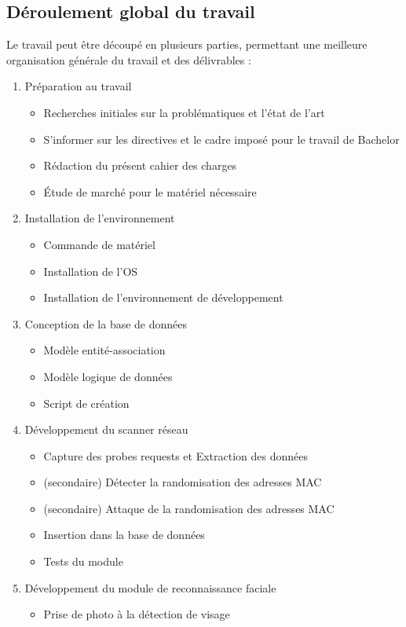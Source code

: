 \subsection*{Déroulement global du travail}
Le travail peut être découpé en plusieurs parties, permettant une meilleure organisation générale du travail et des
délivrables :
\begin{enumerate}
\item Préparation au travail
\begin{itemize}
	\item Recherches initiales sur la problématiques et l’état de l’art
	\item S’informer sur les directives et le cadre imposé pour le travail de Bachelor
	\item Rédaction du présent cahier des charges
	\item Étude de marché pour le matériel nécessaire
\end{itemize}
\item Installation de l’environnement
\begin{itemize}
	\item Commande de matériel
	\item Installation de l’OS
	\item Installation de l’environnement de développement
\end{itemize}
\item Conception de la base de données
\begin{itemize}
	\item Modèle entité-association
	\item Modèle logique de données
	\item Script de création
\end{itemize}
\item Développement du scanner réseau
\begin{itemize}
	\item Capture des probes requests et Extraction des données
	\item (secondaire) Détecter la randomisation des adresses MAC
	\item (secondaire) Attaque de la randomisation des adresses MAC
	\item Insertion dans la base de données
	\item Tests du module
\end{itemize}
\item Développement du module de reconnaissance faciale
\begin{itemize}
	\item Prise de photo à la détection de visage

\end{itemize}
\end{enumerate}
